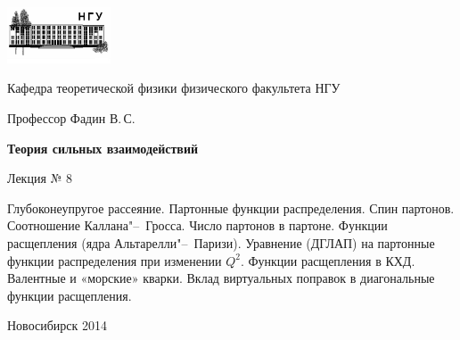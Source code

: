 \documentclass[12pt,pagesize,paper=192mm:108mm]{scrbook}
\begin{document}
\begin{titlepage}
  \vspace*{-1em}
  \begin{center}
    \includegraphics[width=0.23\textwidth]{../NSU-logo}

    Кафедра теоретической физики физического факультета НГУ
    \medskip

    \Large
    Профессор Фадин В.\,С.

    \huge
    \textbf{Теория сильных взаимодействий}
    \smallskip
    
    \Large
    Лекция № 8
    \vfill
    
    \normalsize
    \begin{minipage}{0.8\linewidth}
      Глубоконеупругое рассеяние. Партонные функции
      распределения. Спин партонов. Соотношение
      Каллана"--~Гросса. Число партонов в партоне. Функции расщепления
      (ядра Альтарелли"--~Паризи). Уравнение (ДГЛАП) на партонные функции
      распределения при изменении $Q^2$. Функции расщепления в
      КХД. Валентные и «морские» кварки. Вклад виртуальных поправок в
      диагональные функции расщепления.
    \end{minipage}
    \vfill
    
    \normalsize \ccbysa\hspace{0.5em}  Новосибирск 2014   
  \end{center}
\end{titlepage}
\end{document}
